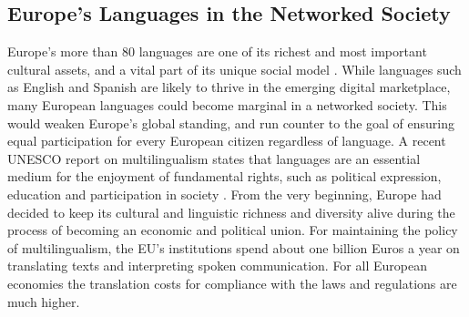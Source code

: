 \documentclass[10pt, plain]{../../metanetpaper}
\begin{document}
\clearpage



\begin{multicols}{2}

\subsection{Europe's Languages in the Networked Society}
\label{sec:status-europes-languages}

Europe’s more than 80 languages are one of its richest and most important cultural assets, and a vital part of its unique social model \cite{EC2,eurobarometer2012}. While languages such as English and Spanish are likely to thrive in the emerging digital marketplace, many European languages could become marginal in a networked society. This would weaken Europe’s global standing, and run counter to the goal of ensuring equal participation for every European citizen regardless of language. A recent UNESCO report on multilingualism states that languages are an essential medium for the enjoyment of fundamental rights, such as political expression, education and participation in society \cite{Unesco1,maaya2012,ifa2008,ifa2011}. From the very beginning, Europe had decided to keep its cultural and linguistic richness and diversity alive during the process of becoming an economic and political union. For maintaining the policy of multilingualism, the EU’s institutions spend about one billion Euros a year on translating texts and interpreting spoken communication. For all European economies the translation costs for compliance with the laws and regulations are much higher.


\end{multicols}
\end{document}
